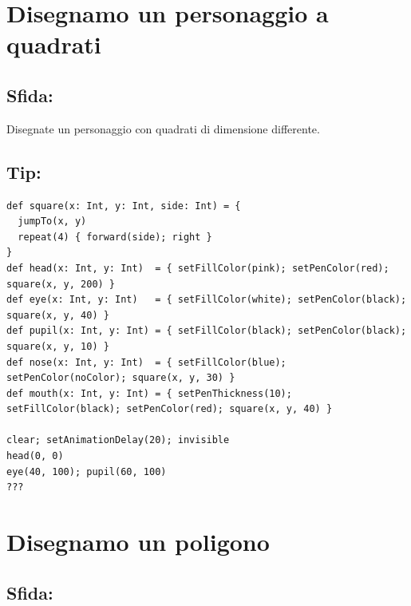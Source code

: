 \chapter{Disegnamo un personaggio a quadrati}\section*{\color{BrickRed}Sfida:}
Disegnate un personaggio con quadrati di dimensione differente.
\\


  
\section*{\color{OliveGreen}Tip:}

\begin{lstlisting}[basicstyle={\ttfamily\fontsize{14}{17}\selectfont},numbers=none]
def square(x: Int, y: Int, side: Int) = {
  jumpTo(x, y)
  repeat(4) { forward(side); right }
}
def head(x: Int, y: Int)  = { setFillColor(pink); setPenColor(red); square(x, y, 200) }
def eye(x: Int, y: Int)   = { setFillColor(white); setPenColor(black); square(x, y, 40) }
def pupil(x: Int, y: Int) = { setFillColor(black); setPenColor(black); square(x, y, 10) }
def nose(x: Int, y: Int)  = { setFillColor(blue); setPenColor(noColor); square(x, y, 30) }
def mouth(x: Int, y: Int) = { setPenThickness(10); setFillColor(black); setPenColor(red); square(x, y, 40) }

clear; setAnimationDelay(20); invisible
head(0, 0)
eye(40, 100); pupil(60, 100)
???
\end{lstlisting}
        
\chapter{Disegnamo un poligono}\section*{\color{BrickRed}Sfida:}


